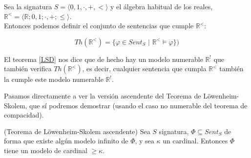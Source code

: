 \begin{example}
Sea la signatura $S=\langle0,1,\cdot,+,<\rangle$ y el álgebra habitual de los reales, $\mathbb{R}^<=\langle\mathbb{R};0,1;\cdot,+;\leq\rangle$.\\

Entonces podemos definir el conjunto de sentencias que cumple $\mathbb{R}^<$:

\[Th(\mathbb{R}^<)=\{\varphi\in Sent_S\, \, | \, \, \mathbb{R}^<\vDash\varphi\})\]

El teorema \ref{LSD} nos dice que de hecho hay un modelo numerable $\mathbb{R}^!$ que también verifica $Th(\mathbb{R}^<)$, es decir, cualquier sentencia que cumpla $\mathbb{R}^<$ también la cumple este modelo numerable $\mathbb{R}^!$.
\end{example}

Pasamos directamente a ver la versión ascendente del Teorema de Löwenheim-Skolem, que sí podremos demostrar (usando el caso no numerable del teorema de compacidad).

\begin{theorem}(Teorema de Löwenheim-Skolem ascendente)
Sea $S$ signatura, $\Phi\subseteq Sent_S$ de forma que existe algún modelo infinito de $\Phi$, y sea $\kappa$ un cardinal. Entonces $\Phi$ tiene un modelo de cardinal $\geq\kappa$.
\end{theorem}

